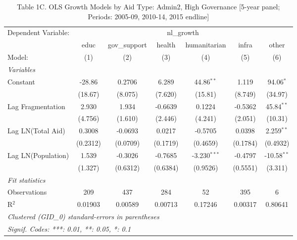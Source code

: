 
\begin{table}[H]
   \caption{Table 1C. OLS Growth Models by Aid Type: Admin2, High Governance [5-year panel; Periods: 2005-09, 2010-14, 2015 endline]}
   \centering
   \begin{tabular}{lcccccc}
      \tabularnewline \midrule \midrule
      Dependent Variable: & \multicolumn{6}{c}{nl\_growth}\\
                         & educ     & gov\_support  & health   & humanitarian   & infra    & other \\   
      Model:             & (1)      & (2)           & (3)      & (4)            & (5)      & (6)\\  
      \midrule
      \emph{Variables}\\
      Constant           & -28.86   & 0.2706        & 6.289    & 44.86$^{**}$   & 1.119    & 94.06$^{*}$\\   
                         & (18.67)  & (8.075)       & (7.620)  & (15.81)        & (8.749)  & (34.97)\\   
      Lag Fragmentation  & 2.930    & 1.934         & -0.6639  & 0.1224         & -0.5362  & 45.84$^{**}$\\   
                         & (4.756)  & (1.610)       & (2.446)  & (4.241)        & (2.051)  & (10.31)\\   
      Lag LN(Total Aid)  & 0.3008   & -0.0693       & 0.0217   & -0.5705        & 0.0398   & 2.259$^{**}$\\   
                         & (0.2312) & (0.0709)      & (0.1719) & (0.4659)       & (0.1784) & (0.4932)\\   
      Lag LN(Population) & 1.539    & -0.3026       & -0.7685  & -3.230$^{***}$ & -0.4797  & -10.58$^{**}$\\   
                         & (1.327)  & (0.6312)      & (0.6384) & (0.9526)       & (0.5551) & (3.311)\\   
      \midrule
      \emph{Fit statistics}\\
      Observations       & 209      & 437           & 284      & 52             & 395      & 6\\  
      R$^2$              & 0.01903  & 0.00589       & 0.00713  & 0.17246        & 0.00317  & 0.80641\\  
      \midrule \midrule
      \multicolumn{7}{l}{\emph{Clustered (GID\_0) standard-errors in parentheses}}\\
      \multicolumn{7}{l}{\emph{Signif. Codes: ***: 0.01, **: 0.05, *: 0.1}}\\
   \end{tabular}
\end{table}



